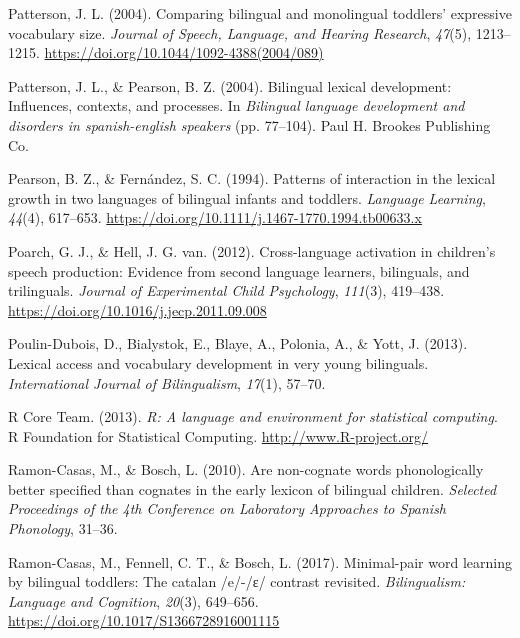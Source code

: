 \documentclass[
]{article}
\newlength{\cslhangindent}
\newlength{\cslentryspacingunit} %
\newenvironment{CSLReferences}[2] %
 {%
  \setlength{\parindent}{0pt}
  \ifodd #1
  \let\oldpar\par
  \def\par{\hangindent=\cslhangindent\oldpar}
  \fi
  \setlength{\parskip}{#2\cslentryspacingunit}
 }%
 {}
\begin{document}
\begin{CSLReferences}{1}{0}
\leavevmode{}%
Patterson, J. L. (2004). Comparing bilingual and monolingual toddlers'
expressive vocabulary size. \emph{Journal of Speech, Language, and
Hearing Research}, \emph{47}(5), 1213--1215.
\url{https://doi.org/10.1044/1092-4388(2004/089)}

\leavevmode{}%
Patterson, J. L., \& Pearson, B. Z. (2004). Bilingual lexical
development: Influences, contexts, and processes. In \emph{Bilingual
language development and disorders in spanish-english speakers} (pp.
77--104). Paul H. Brookes Publishing Co.

\leavevmode{}%
Pearson, B. Z., \& Fernández, S. C. (1994). Patterns of interaction in
the lexical growth in two languages of bilingual infants and toddlers.
\emph{Language Learning}, \emph{44}(4), 617--653.
\url{https://doi.org/10.1111/j.1467-1770.1994.tb00633.x}

\leavevmode{}%
Poarch, G. J., \& Hell, J. G. van. (2012). Cross-language activation in
children's speech production: Evidence from second language learners,
bilinguals, and trilinguals. \emph{Journal of Experimental Child
Psychology}, \emph{111}(3), 419--438.
\url{https://doi.org/10.1016/j.jecp.2011.09.008}

\leavevmode{}%
Poulin-Dubois, D., Bialystok, E., Blaye, A., Polonia, A., \& Yott, J.
(2013). Lexical access and vocabulary development in very young
bilinguals. \emph{International Journal of Bilingualism}, \emph{17}(1),
57--70.

\leavevmode{}%
R Core Team. (2013). \emph{R: A language and environment for statistical
computing}. R Foundation for Statistical Computing.
\url{http://www.R-project.org/}

\leavevmode{}%
Ramon-Casas, M., \& Bosch, L. (2010). Are non-cognate words
phonologically better specified than cognates in the early lexicon of
bilingual children. \emph{Selected Proceedings of the 4th Conference on
Laboratory Approaches to Spanish Phonology}, 31--36.

\leavevmode{}%
Ramon-Casas, M., Fennell, C. T., \& Bosch, L. (2017). Minimal-pair word
learning by bilingual toddlers: The catalan /e/-/ɛ/ contrast revisited.
\emph{Bilingualism: Language and Cognition}, \emph{20}(3), 649--656.
\url{https://doi.org/10.1017/S1366728916001115}


\end{CSLReferences}
\end{document}
